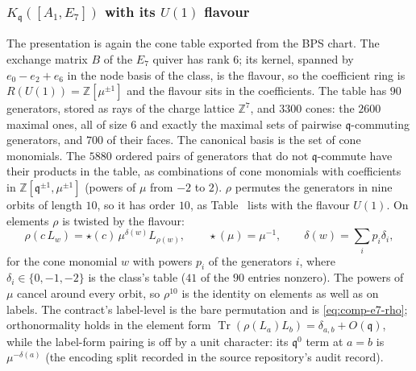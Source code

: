 \documentclass[11pt]{amsart}
\makeatletter
\DeclareMathOperator{\Tr}{Tr}
\newcommand\fq{\mathfrak{q}}
\newcommand\bZ{\mathbb{Z}}
\theoremstyle{remark}
\newcommand{\pref}[1]{\@ifundefined{r@P-#1}{\textup{[\texttt{\detokenize{#1}}]}}{\ref{P-#1}}}
\makeatother
\begin{document}
\subsubsection{$K_\fq([A_1,E_7])$ with its $U(1)$ flavour}\label{comp:e7}
The presentation is again the cone table exported from the BPS chart.  The exchange matrix $B$ of the $E_7$ quiver has rank
$6$; its kernel, spanned by $e_0-e_2+e_6$ in the node basis of the class, is the
flavour, so the coefficient ring is $R(U(1))=\bZ[\mu^{\pm1}]$ and the flavour
sits in the coefficients.  The table has $90$ generators, stored as rays of the
charge lattice $\bZ^7$, and $3300$ cones: the $2600$ maximal ones, all of size
$6$ and exactly the maximal sets of pairwise $\fq$-commuting generators, and
$700$ of their faces.  The canonical basis is the set of cone monomials.  The
$5880$ ordered pairs of generators that do not $\fq$-commute have their
products in the table, as combinations of cone
monomials with coefficients in $\bZ[\fq^{\pm1},\mu^{\pm1}]$ (powers of $\mu$
from $-2$ to $2$).  $\rho$ permutes the generators in nine orbits of length
$10$, so it has order $10$, as Table~\pref{tab:finite_type} lists with the
flavour $U(1)$.  On elements $\rho$ is twisted by the flavour:
\begin{equation}\label{eq:comp-e7-rho}
  \rho(c\,L_w)=\star(c)\,\mu^{\delta(w)}L_{\rho(w)},\qquad
  \star(\mu)=\mu^{-1},\qquad \delta(w)=\sum_ip_i\delta_i ,
\end{equation}
for the cone monomial $w$ with powers $p_i$ of the generators $i$, where
$\delta_i\in\{0,-1,-2\}$ is the class's table  ($41$ of the
$90$ entries nonzero).  The powers of $\mu$ cancel around every orbit, so
$\rho^{10}$ is the identity on elements as well as on labels.  The contract's
label-level  is the bare permutation and  is
\eqref{eq:comp-e7-rho}; orthonormality holds in the element form
$\Tr(\rho(L_a)L_b)=\delta_{a,b}+O(\fq)$, while the label-form pairing
 is off by a unit character: its $\fq^0$ term at $a=b$ is
$\mu^{-\delta(a)}$ (the encoding split recorded in the source repository's audit record).
\end{document}
